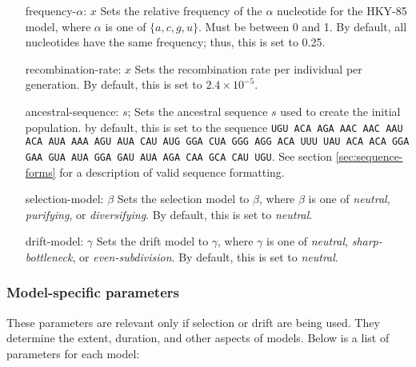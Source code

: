 \documentclass{article}
\begin{document}
\begin{enumerate}
          \item[frequency-$\alpha$: $x$]
          Sets the relative frequency of the $\alpha$ nucleotide for the HKY-85
          model, where $\alpha$ is one of $\{a, c, g, u\}$. Must be between 0
          and 1. By default, all nucleotides have the same frequency; thus,
          this is set to 0.25.

          \item[recombination-rate: $x$]
          Sets the recombination rate per individual per generation. By default,
          this is set to $2.4 \times 10^{-5}$.

          \item[ancestral-sequence: $s$;]
          Sets the ancestral sequence $s$ used to create the initial population.
          by default, this is set to the sequence {\tt UGU ACA AGA AAC AAC AAU
          ACA AUA AAA AGU AUA CAU AUG GGA CUA GGG AGG ACA UUU UAU ACA ACA GGA
          GAA GUA AUA GGA GAU AUA AGA CAA GCA CAU UGU}. See section
	  \ref{sec:sequence-forms} for a description of valid sequence
	  formatting.

          \item[selection-model: $\beta$]
          Sets the selection model to $\beta$, where $\beta$ is one of {\em
          neutral}, {\em purifying}, or {\em diversifying}. By default, this is
          set to {\em neutral}.

          \item[drift-model: $\gamma$]
          Sets the drift model to $\gamma$, where $\gamma$ is one of {\em
          neutral}, {\em sharp-bottleneck}, or {\em even-subdivision}. By
          default, this is set to {\em neutral}.
        \end{enumerate}

      \subsubsection{Model-specific parameters}
        \label{sec:model-directives}

        These parameters are relevant only if selection or drift are being used.
        They determine the extent, duration, and other aspects of models. Below
        is a list of parameters for each model:
\end{document}
